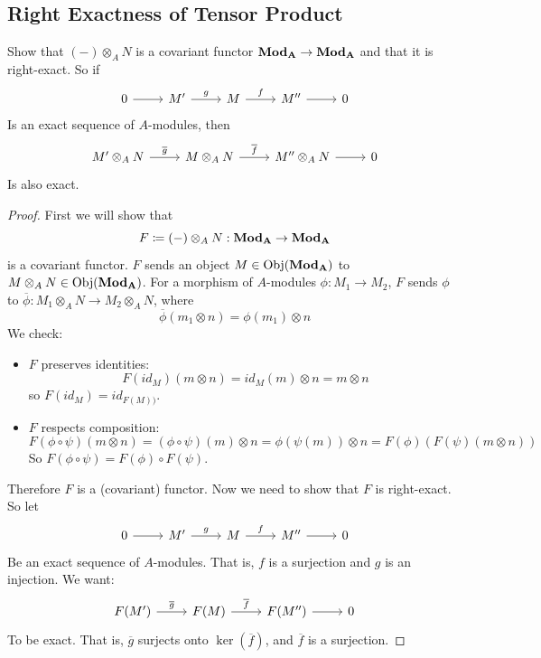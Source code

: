 \documentclass[hidelinks,12pt]{article}
\newcommand{\obj}{\operatorname{Obj}}
\newcommand{\catname}[1]{{\normalfont\mathbf{#1}}}
\begin{document}
\subsection{Right Exactness of Tensor Product}
Show that \((-)\otimes_{A}N\) is a covariant functor \(\catname{Mod_{A}}\to\catname{Mod_{A}}\) and that it is right-exact. So if \[
    \begin{tikzcd} 0 \arrow[r] & M' \arrow[r, "g"] & M \arrow[r, "f"] & M'' \arrow[r] & 0 \end{tikzcd}
\]
Is an exact sequence of \(A\)-modules, then
\[
    \begin{tikzcd} M'\otimes_{A}N \arrow[r, "\overline{g}"] & M\otimes_{A}N \arrow[r, "\overline{f}"] & M''\otimes_{A}N \arrow[r] & 0 \end{tikzcd}
\]
Is also exact.
\begin{proof}
First we will show that \[
    F\coloneqq (-)\otimes_{A}N:\catname{Mod_{A}}\to\catname{Mod_{A}}
\]
is a covariant functor. \(F\) sends an object \(M\in\obj(\catname{Mod_{A}})\) to \(M\otimes_{A}N\in\obj(\catname{Mod_{A}})\). For a morphism of \(A\)-modules \(\phi:M_{1}\to M_{2}\), \(F\) sends \(\phi\) to \(\overline{\phi}:M_{1}\otimes_{A}N\to M_{2}\otimes_{A}N\), where \[
    \overline{\phi}(m_{1}\otimes n)=\phi(m_{1})\otimes n
\]
We check: \begin{itemize}
    \item \(F\) preserves identities:
        \[
            F(id_{M})(m\otimes n)=id_{M}(m)\otimes n=m\otimes n
        \]
        so \(F(id_{M})=id_{F(M))}\).
    \item \(F\) respects composition:
        \[
            F(\phi\circ \psi)(m\otimes n)=(\phi\circ\psi)(m)\otimes n=\phi(\psi(m))\otimes n=F(\phi)(F(\psi)(m\otimes n))
        \]
        So \(F\left(\phi\circ\psi\right)=F(\phi)\circ F(\psi)\).
\end{itemize}
Therefore \(F\) is a (covariant) functor. Now we need to show that \(F\) is right-exact. So let 
\[
\begin{tikzcd} 0 \arrow[r] & M' \arrow[r, "g"] & M \arrow[r, "f"] & M'' \arrow[r] & 0 \end{tikzcd}
\]
Be an exact sequence of \(A\)-modules. That is, \(f\) is a surjection and \(g\) is an injection. We want: \[
    \begin{tikzcd} F(M') \arrow[r, "\overline{g}"] & F(M) \arrow[r, "\overline{f}"] & F(M'') \arrow[r] & 0 \end{tikzcd}
\]
To be exact. That is, \(\overline{g}\) surjects onto \(\ker(\overline{f})\), and \(\overline{f}\) is a surjection.

\end{proof}
\end{document}

